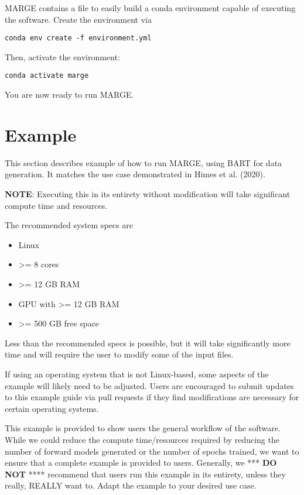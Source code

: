 \documentclass[letterpaper, 12pt]{article}
\begin{document}
\noindent MARGE contains a file to easily build a conda environment capable of 
executing the software.  Create the environment via

\begin{verbatim}
conda env create -f environment.yml
\end{verbatim}

\noindent Then, activate the environment:

\begin{verbatim}
conda activate marge
\end{verbatim}

\noindent You are now ready to run MARGE.


\section{Example}
\label{sec:example}

This section describes example of how to run MARGE, using BART for data 
generation. It matches the use case demonstrated in Himes et al. (2020).

\noindent \textbf{NOTE}: Executing this in its entirety without modification 
will take significant compute time and resources.

\noindent The recommended system specs are
\begin{itemize}
\item Linux
\item {\textgreater}= 8 cores
\item {\textgreater}= 12 GB RAM
\item GPU with {\textgreater}= 12 GB RAM
\item {\textgreater}= 500 GB free space
\end{itemize}

\noindent Less than the recommended specs is possible, but it will take 
significantly more time and will require the user to modify some of the 
input files.

\noindent If using an operating system that is not Linux-based, some aspects 
of the example will likely need to be adjusted.  Users are encouraged to submit 
updates to this example guide via pull requests if they find modifications are 
necessary for certain operating systems.

\noindent This example is provided to show users the general workflow of the 
software.  While we could reduce the compute time/resources required by 
reducing the number of forward models generated or the number of epochs 
trained, we want to ensure that a complete example is provided to users.  
Generally, we *** \textbf{DO NOT} **** recommend that users run this example in 
its entirety, unless they really, REALLY want to.  Adapt the example to your 
desired use case.
\end{document}
